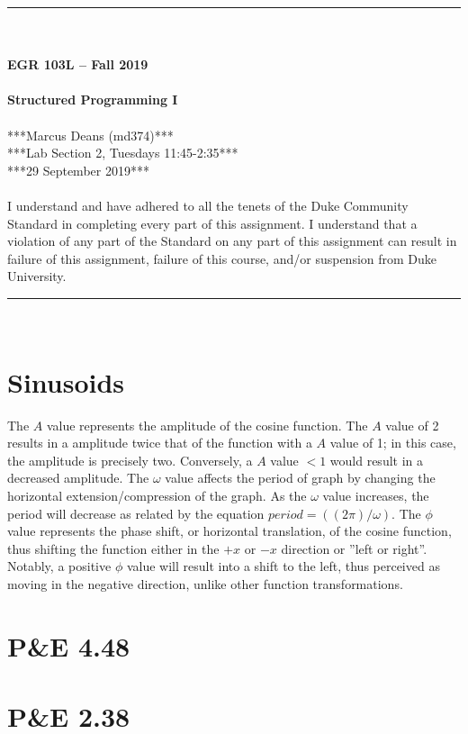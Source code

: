 \documentclass{article}
\begin{document}
\begin{center}
\rule{6.5in}{0.5mm}\\~\\
\textbf{\large EGR 103L -- Fall 2019}\\~\\
\textbf{\huge Structured Programming I}\\~\\
***Marcus Deans (md374)***\\
***Lab Section 2, Tuesdays 11:45-2:35***\\
***29 September 2019***\\~\\
{\small I understand and have adhered to all the tenets of the Duke
  Community Standard in completing every part of this assignment.  I
  understand that a violation of any part of the Standard on any part
  of this assignment can result in failure of this assignment, failure
  of this course, and/or suspension from Duke University.} 
\rule{6.5in}{0.5mm}\\
\end{center}
\tableofcontents
\listoffigures
\pagebreak

\section{Sinusoids}
The $A$ value represents the amplitude of the cosine function. The $A$ value of 2 results in a amplitude twice that of the function with a $A$ value of 1; in this case, the amplitude is precisely two. Conversely, a $A$ value $<1$ would result in a decreased amplitude. The $\omega$ value affects the period of graph by changing the horizontal extension/compression of the graph. As the $\omega$ value increases, the period will decrease as related by the equation $period = ((2\pi)/\omega)$. The $\phi$ value represents the phase shift, or horizontal translation, of the cosine function, thus shifting the function either in the $+x$ or $-x$ direction or ''left or right''. Notably, a positive $\phi$ value will result into a shift to the left, thus perceived as moving in the negative direction, unlike other function transformations.

\section{P\&E 4.48}


\section{P\&E 2.38}

\end{document}
